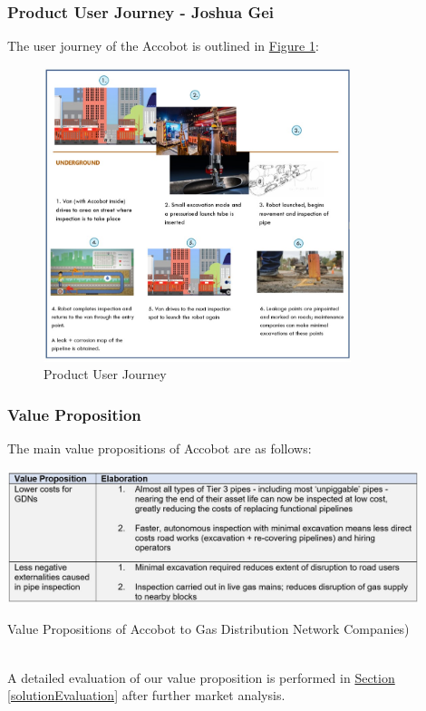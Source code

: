 \documentclass[11pt]{article}		%
\newcommand{\figref}[1]{\hyperref[#1]{Figure \ref*{#1}}}    %
\newcommand{\sectref}[1]{\hyperref[#1]{Section \ref*{#1}}}     %
\begin{document}
	\subsubsection[Product User Journey]{Product User Journey - Joshua Gei}
	The user journey of the Accobot is outlined in \figref{userjourney}:
	\begin{figure}[h]
				\centering
				\includegraphics[width=0.8\textwidth]{userjourneyfull.jpg}
				\caption{Product User Journey}
				\label{userjourney}
			\end{figure}
	\subsubsection[Value Proposition]{Value Proposition}
	The main value propositions of Accobot are as follows:
        \begin{table}[h]
			\centering
			\includegraphics[width=0.9\textwidth]{ValueProposition.jpg}
			\caption{Value Propositions of Accobot to Gas Distribution Network Companies)}
			\label{VP}
 		\end{table}
 	\vspace{-0.2cm}
	\\A detailed evaluation of our value proposition is performed in \sectref{solutionEvaluation} after further market analysis.
	
\end{document}
